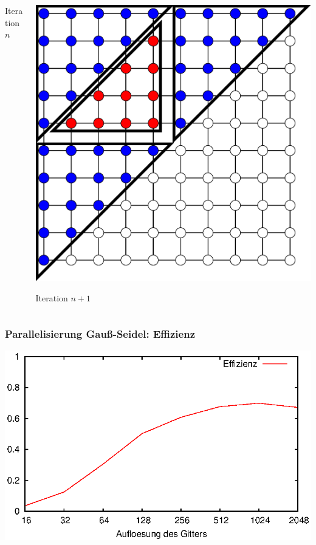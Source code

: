 \documentclass{beamer}
\begin{document}
\begin{frame}
\begin{columns}
\begin{column}{0.5\textwidth}
            \centering Iteration $n$
        \end{column}
        \begin{column}{0.5\textwidth}
            \includegraphics[width=\textwidth]{triangles2}
            
            \centering Iteration $n+1$
        \end{column}
    \end{columns}
\end{frame}

\begin{frame}
    \frametitle{Parallelisierung Gauß-Seidel: Effizienz}
    \includegraphics[width=\textwidth]{plots/effizienzgaussseidel}
\end{frame}
\end{document}
